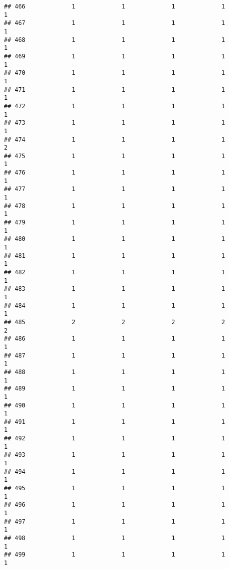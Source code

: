 \documentclass[
]{article}
\begin{document}
\begin{verbatim}
## 466             1             1             1             1             1
## 467             1             1             1             1             1
## 468             1             1             1             1             1
## 469             1             1             1             1             1
## 470             1             1             1             1             1
## 471             1             1             1             1             1
## 472             1             1             1             1             1
## 473             1             1             1             1             1
## 474             1             1             1             1             2
## 475             1             1             1             1             1
## 476             1             1             1             1             1
## 477             1             1             1             1             1
## 478             1             1             1             1             1
## 479             1             1             1             1             1
## 480             1             1             1             1             1
## 481             1             1             1             1             1
## 482             1             1             1             1             1
## 483             1             1             1             1             1
## 484             1             1             1             1             1
## 485             2             2             2             2             2
## 486             1             1             1             1             1
## 487             1             1             1             1             1
## 488             1             1             1             1             1
## 489             1             1             1             1             1
## 490             1             1             1             1             1
## 491             1             1             1             1             1
## 492             1             1             1             1             1
## 493             1             1             1             1             1
## 494             1             1             1             1             1
## 495             1             1             1             1             1
## 496             1             1             1             1             1
## 497             1             1             1             1             1
## 498             1             1             1             1             1
## 499             1             1             1             1             1

\end{verbatim}
\end{document}
